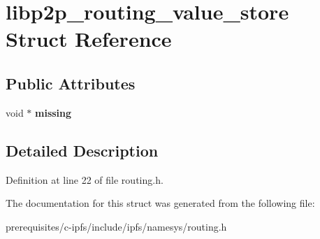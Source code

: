 \hypertarget{structlibp2p__routing__value__store}{}\section{libp2p\+\_\+routing\+\_\+value\+\_\+store Struct Reference}
\label{structlibp2p__routing__value__store}
\subsection*{Public Attributes}
\begin{DoxyCompactItemize}
\item 
\mbox{\label{structlibp2p__routing__value__store_a2eaad738754d9c1514b972e9b26cc6cf}} 
void $\ast$ {\bfseries missing}
\end{DoxyCompactItemize}


\subsection{Detailed Description}


Definition at line 22 of file routing.\+h.



The documentation for this struct was generated from the following file\+:\begin{DoxyCompactItemize}
\item 
prerequisites/c-\/ipfs/include/ipfs/namesys/routing.\+h\end{DoxyCompactItemize}
